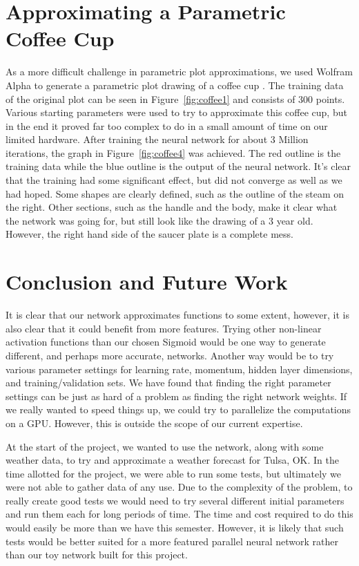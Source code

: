\documentclass{article}
\begin{document}
\begin{multicols}{2}
\section{Approximating a Parametric Coffee Cup}

As a more difficult challenge in parametric plot approximations, we used Wolfram Alpha to generate a parametric plot drawing of a coffee cup \cite{wolfram}. The training data of the original plot can be seen in Figure~\ref{fig:coffee1} and consists of 300 points. Various starting parameters were used to try to approximate this coffee cup, but in the end it proved far too complex to do in a small amount of time on our limited hardware. After training the neural network for about 3 Million iterations, the graph in Figure~\ref{fig:coffee4} was achieved. The red outline is the training data while the blue outline is the output of the neural network. It's clear that the training had some significant effect, but did not converge as well as we had hoped. Some shapes are clearly defined, such as the outline of the steam on the right. Other sections, such as the handle and the body, make it clear what the network was going for, but still look like the drawing of a 3 year old. However, the right hand side of the saucer plate is a complete mess.

\section{Conclusion and Future Work}

It is clear that our network approximates functions to some extent, however, it is also clear that it could benefit from more features. Trying other non-linear activation functions than our chosen Sigmoid would be one way to generate different, and perhaps more accurate, networks. Another way would be to try various parameter settings for learning rate, momentum, hidden layer dimensions, and training/validation sets. We have found that finding the right parameter settings can be just as hard of a problem as finding the right network weights. If we really wanted to speed things up, we could try to parallelize the computations on a GPU. However, this is outside the scope of our current expertise.

At the start of the project, we wanted to use the network, along with some weather data, to try and approximate a weather forecast for Tulsa, OK. In the time allotted for the project, we were able to run some tests, but ultimately we were not able to gather data of any use. Due to the complexity of the problem, to really create good tests we would need to try several different initial parameters and run them each for long periods of time. The time and cost required to do this would easily be more than we have this semester. However, it is likely that such tests would be better suited for a more featured parallel neural network rather than our toy network built for this project.




\end{multicols}
\end{document}
